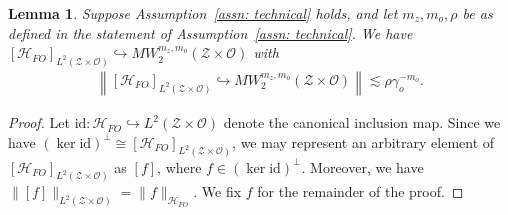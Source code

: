 \documentclass[11pt]{article}
\newcommand{\calZ}{\mathcal{Z}}
\newcommand{\calH}{\mathcal{H}}
\newcommand{\calO}{\mathcal{O}}
\newcommand{\0}{\mathbf{0}}
\newtheorem{lem}{Lemma}[section]
\begin{document}
\begin{appendix}
\begin{lem}
\label{lem:hfo_conts_embedding}
Suppose Assumption~\ref{assn: technical} holds, and let $m_z,m_o,\rho$ be as defined in the statement of Assumption~\ref{assn: technical}. We have $[\calH_{FO}]_{L^2(\calZ\times \calO)}\hookrightarrow MW^{m_z,m_o}_2(\calZ\times\calO)$ with 
\begin{align*}
    \left\|[\calH_{FO}]_{L^2(\calZ\times \calO)}\hookrightarrow MW^{m_z,m_o}_2(\calZ\times \calO)\right\| \lesssim \rho \gamma_o^{-m_o} .
\end{align*}
\end{lem}
\begin{proof}
Let $\mathrm{id}: \calH_{FO}\hookrightarrow L^2(\calZ\times \calO)$ denote the canonical inclusion map. Since we have $(\ker \mathrm{id})^{\perp} \cong [\calH_{FO}]_{L^2(\calZ\times \calO)}$, we may represent an arbitrary element of $[\calH_{FO}]_{L^2(\calZ\times \calO)}$ as $[f]$, where $f\in (\ker \mathrm{id})^{\perp}$. Moreover, we have $\|[f]\|_{L^2(\calZ\times \calO)} = \|f\|_{\calH_{FO}}$. We fix $f$ for the remainder of the proof. 


\end{proof}
\end{appendix}
\end{document}
